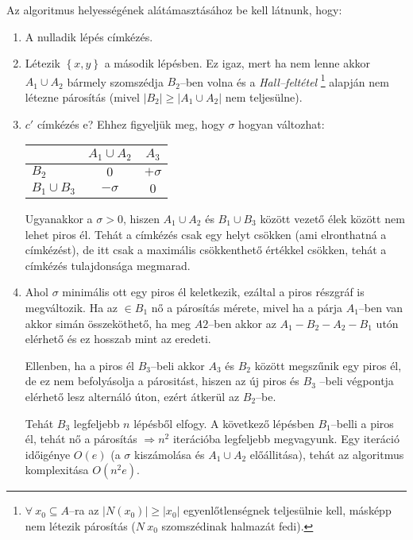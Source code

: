 Az algoritmus helyességének alátámasztásához be kell látnunk, hogy:

\begin{enumerate}
  \item A nulladik lépés címkézés.
  \item Létezik $\left\{x,y\right\}$ a második lépésben. Ez igaz, mert ha nem
  lenne akkor $A_1 \cup A_2$ bármely szomszédja $B_2$--ben volna és a
  \emph{Hall--feltétel} \footnote{$ \forall~x_0 \subseteq A$--ra az $|N(x_0)|
  \geq |x_0|$ egyenlőtlenségnek teljesülnie kell, másképp nem létezik párosítás
  ($N~x_0$ szomszédinak halmazát fedi).} alapján nem létezne párosítás 
  (mivel $|B_2| \geq |A_1 \cup A_2|$ nem teljesülne).
  \item $c'$ címkézés e? Ehhez figyeljük meg, hogy $\sigma$ hogyan változhat:
  
  \begin{tabular}{ l |  c c }
                  & $A_1 \cup A_2$ & $A_3$ \\
                  \hline
  $B_2$           & $0$            & $+\sigma$ \\
  $B_1 \cup B_3$ & $-\sigma$      & $0$ \\
  \end{tabular}
  
  Ugyanakkor a $\sigma > 0 $, hiszen $A_1 \cup A_2$ és $B_1 \cup B_3$ között
  vezető élek között nem lehet piros él. Tehát a címkézés csak egy helyt csökken
  (ami elronthatná a címkézést), de itt csak a maximális csökkenthető értékkel
  csökken, tehát a címkézés tulajdonsága megmarad.
 
  \item Ahol $\sigma$ minimális ott egy piros él keletkezik, ezáltal a piros
  részgráf is megváltozik. Ha az $\in B_1$ nő a párosítás mérete, mivel ha a
  párja $A_1$--ben van akkor simán összeköthető, ha meg $A2$--ben akkor az
  $A_1-B_2-A_2-B_1$ utón elérhető és ez hosszab mint az eredeti. 
  
  Ellenben, ha a piros él $B_3$--beli akkor $A_3$ és $B_2$ között megszűnik egy
  piros él, de ez nem befolyásolja a párositást, hiszen az új piros és $B_3$
  --beli végpontja elérhető lesz alternáló úton, ezért átkerül az $B_2$--be.
  
  Tehát $B_3$ legfeljebb $n$ lépésből elfogy. A  következő lépésben $B_1$--belli
  a piros él, tehát nő a párosítás $\Rightarrow n^2$ iterációba legfeljebb
  megvagyunk. Egy iteráció időigénye $O(e)$ (a $\sigma$ kiszámolása és $A_1 \cup
  A_2$ előállitása), tehát az algoritmus komplexitása $O(n^2e)$.
  \end{enumerate}
